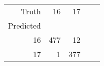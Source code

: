 \begin{tabular}{rrrrr}
\toprule
Truth & 16 & 17 \\
Predicted &  &  \\
\midrule
16 & 477 & 12 \\
17 & 1 & 377 \\
\bottomrule
\end{tabular}
